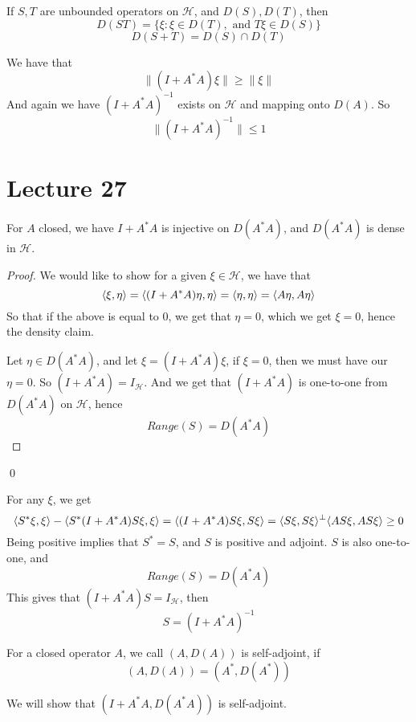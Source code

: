 If $S,T$ are unbounded operators on $\mathcal{H}$, and $D(S), D(T)$, then
\begin{equation*}
    D(ST)=\{\xi:\xi\in D(T), \text{ and } T\xi\in D(S)\}
\end{equation*}
\begin{equation*}
    D(S+T)=D(S)\cap D(T)
\end{equation*}

We have that
\begin{equation*}
    \|(I+A^*A)\xi\|\geq\|\xi\|
\end{equation*}
And again we have $(I+A^*A)^{-1}$ exists on $\mathcal{H}$ and mapping onto $D(A)$. So
\begin{equation*}
    \|(I+A^*A)^{-1}\|\leq 1
\end{equation*}

\section{Lecture 27}
\begin{proposition}
    For $A$ closed, we have $I+A^*A$ is injective on $D(A^*A)$, and $D(A^*A)$ is dense in $\mathcal{H}$.
\end{proposition}
\begin{proof}
    We would like to show for a given $\xi\in\mathcal{H}$, we have that
    \begin{equation*}
        \langle \xi, \eta\rangle=\langle(I+A^*A)\eta, \eta\rangle=\langle\eta, \eta\rangle=\langle A\eta, A\eta\rangle
    \end{equation*}
    So that if the above is equal to 0, we get that $\eta=0$, which we get $\xi=0$, hence the density claim.

    Let $\eta\in D(A^*A)$, and let $\xi=(I+A^*A)\xi$, if $\xi=0$, then we must have our $\eta=0$. So $(I+A^*A)=I_\mathcal{H}$. And we get that $(I+A^*A)$ is one-to-one from $D(A^*A)$ on $\mathcal{H}$, hence
    \begin{equation*}
        Range(S)=D(A^*A)
    \end{equation*} 
\end{proof}
\qed

For any $\xi$, we get
\begin{equation*}
    \langle S^*\xi, \xi\rangle-\langle S^*(I+A^*A)S\xi, \xi\rangle=\langle (I+A^*A)S\xi, S\xi\rangle=\langle S\xi, S\xi\rangle^\perp\langle AS\xi, AS\xi\rangle\geq 0
\end{equation*}
Being positive implies that $S^*=S$, and $S$ is positive and adjoint. $S$ is also one-to-one, and
\begin{equation*}
    Range(S)=D(A^*A)
\end{equation*}
This gives that $(I+A^*A)S=I_\mathcal{H}$, then
\begin{equation*}
    S=(I+A^*A)^{-1}
\end{equation*}
\begin{definition}
    For a closed operator $A$, we call $(A,D(A))$ is self-adjoint, if 
    \begin{equation*}
        (A, D(A))=(A^*, D(A^*))
    \end{equation*}
\end{definition}
We will show that $(I+A^*A, D(A^*A))$ is self-adjoint.

